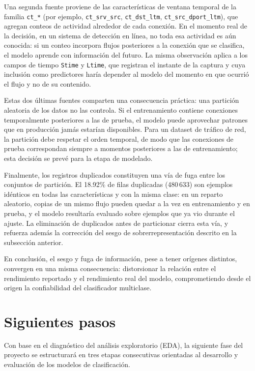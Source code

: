 \documentclass[conference]{IEEEtran}
\begin{document}
Una segunda fuente proviene de las características de ventana temporal de la familia \texttt{ct\_*} (por ejemplo, \texttt{ct\_srv\_src}, \texttt{ct\_dst\_ltm}, \texttt{ct\_src\_dport\_ltm}), que agregan conteos de actividad alrededor de cada conexión. En el momento real de la decisión, en un sistema de detección en línea, no toda esa actividad es aún conocida: si un conteo incorpora flujos posteriores a la conexión que se clasifica, el modelo aprende con información del futuro. La misma observación aplica a los campos de tiempo \texttt{Stime} y \texttt{Ltime}, que registran el instante de la captura y cuya inclusión como predictores haría depender al modelo del momento en que ocurrió el flujo y no de su contenido.

Estas dos últimas fuentes comparten una consecuencia práctica: una partición aleatoria de los datos no las controla. Si el entrenamiento contiene conexiones temporalmente posteriores a las de prueba, el modelo puede aprovechar patrones que en producción jamás estarían disponibles. Para un dataset de tráfico de red, la partición debe respetar el orden temporal, de modo que las conexiones de prueba correspondan siempre a momentos posteriores a las de entrenamiento; esta decisión se prevé para la etapa de modelado.

Finalmente, los registros duplicados constituyen una vía de fuga entre los conjuntos de partición. El 18.92\% de filas duplicadas (480\,633) son ejemplos idénticos en todas las características y con la misma clase: en un reparto aleatorio, copias de un mismo flujo pueden quedar a la vez en entrenamiento y en prueba, y el modelo resultaría evaluado sobre ejemplos que ya vio durante el ajuste. La eliminación de duplicados antes de particionar cierra esta vía, y refuerza además la corrección del sesgo de sobrerrepresentación descrito en la subsección anterior.

En conclusión, el sesgo y fuga de información, pese a tener orígenes distintos, convergen en una misma consecuencia: distorsionar la relación entre el rendimiento reportado y el rendimiento real del modelo, comprometiendo desde el origen la confiabilidad del clasificador multiclase.


\section{Siguientes pasos}

Con base en el diagnóstico del análisis exploratorio (EDA), la siguiente fase del proyecto se estructurará en tres etapas consecutivas orientadas al desarrollo y evaluación de los modelos de clasificación.
\end{document}
